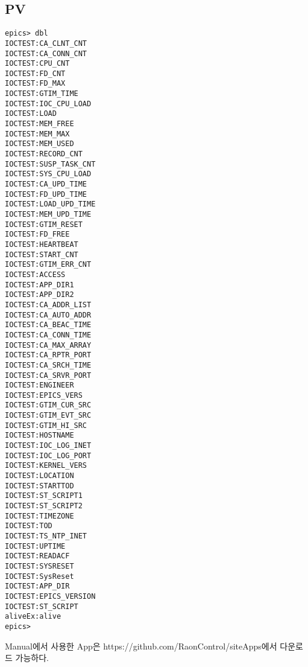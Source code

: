 \documentclass[11pt
  , a4paper
  , article
  , oneside
]{memoir}
\begin{document}
\subsection{PV}
\begin{lstlisting}[style=termstyle]
epics> dbl
IOCTEST:CA_CLNT_CNT
IOCTEST:CA_CONN_CNT
IOCTEST:CPU_CNT
IOCTEST:FD_CNT
IOCTEST:FD_MAX
IOCTEST:GTIM_TIME
IOCTEST:IOC_CPU_LOAD
IOCTEST:LOAD
IOCTEST:MEM_FREE
IOCTEST:MEM_MAX
IOCTEST:MEM_USED
IOCTEST:RECORD_CNT
IOCTEST:SUSP_TASK_CNT
IOCTEST:SYS_CPU_LOAD
IOCTEST:CA_UPD_TIME
IOCTEST:FD_UPD_TIME
IOCTEST:LOAD_UPD_TIME
IOCTEST:MEM_UPD_TIME
IOCTEST:GTIM_RESET
IOCTEST:FD_FREE
IOCTEST:HEARTBEAT
IOCTEST:START_CNT
IOCTEST:GTIM_ERR_CNT
IOCTEST:ACCESS
IOCTEST:APP_DIR1
IOCTEST:APP_DIR2
IOCTEST:CA_ADDR_LIST
IOCTEST:CA_AUTO_ADDR
IOCTEST:CA_BEAC_TIME
IOCTEST:CA_CONN_TIME
IOCTEST:CA_MAX_ARRAY
IOCTEST:CA_RPTR_PORT
IOCTEST:CA_SRCH_TIME
IOCTEST:CA_SRVR_PORT
IOCTEST:ENGINEER
IOCTEST:EPICS_VERS
IOCTEST:GTIM_CUR_SRC
IOCTEST:GTIM_EVT_SRC
IOCTEST:GTIM_HI_SRC
IOCTEST:HOSTNAME
IOCTEST:IOC_LOG_INET
IOCTEST:IOC_LOG_PORT
IOCTEST:KERNEL_VERS
IOCTEST:LOCATION
IOCTEST:STARTTOD
IOCTEST:ST_SCRIPT1
IOCTEST:ST_SCRIPT2
IOCTEST:TIMEZONE
IOCTEST:TOD
IOCTEST:TS_NTP_INET
IOCTEST:UPTIME
IOCTEST:READACF
IOCTEST:SYSRESET
IOCTEST:SysReset
IOCTEST:APP_DIR
IOCTEST:EPICS_VERSION
IOCTEST:ST_SCRIPT
aliveEx:alive
epics> 
\end{lstlisting}
Manual에서 사용한 App은 https://github.com/RaonControl/siteApps에서 다운로드 가능하다.
\end{document}

